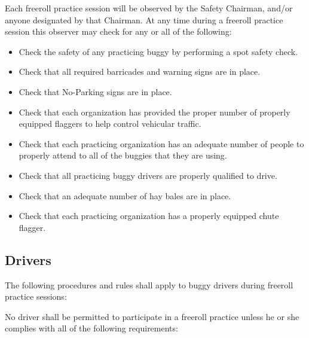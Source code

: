 	Each freeroll practice session will be observed by the Safety Chairman, and/or
	anyone designated by that Chairman. At any time during a freeroll practice
	session this observer may check for any or all of the following:

	\begin{itemize}

		\item Check the safety of any practicing buggy by performing a spot safety
		check.

		\item Check that all required barricades and warning signs are in place.

		\item Check that No-Parking signs are in place.

		\item Check that each organization has provided the proper number of
		properly equipped flaggers to help control vehicular traffic.

		\item Check that each practicing organization has an adequate number of
		people to properly attend to all of the buggies that they are using.

		\item Check that all practicing buggy drivers are properly qualified to
		drive.

		\item Check that an adequate number of hay bales are in place.

		\item Check that each practicing organization has a properly equipped chute
		flagger.

	\end{itemize}

\subsection{Drivers}

	The following procedures and rules shall apply to buggy drivers during freeroll
	practice sessions:
	\newline

	\noindent No driver shall be permitted to participate in a freeroll practice unless he or
	she complies with all of the following requirements:

